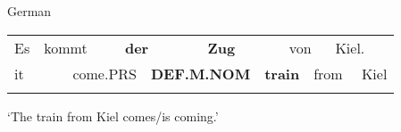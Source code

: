 
\begin{listWWNumileveli}
\item 

\begin{styleExample}
German

\end{styleExample}

\end{listWWNumileveli}

\begin{tabular}{llllllllllll}
\lsptoprule
Es & \multicolumn{2}{l}{kommt

} & \multicolumn{2}{l}{{\bfseries der}

} & \multicolumn{2}{l}{{\bfseries Zug}

} & \multicolumn{2}{l}{von

} & \multicolumn{2}{l}{Kiel.

} & \\
\multicolumn{2}{l}{it

} & \multicolumn{2}{l}{come.PRS

} & \multicolumn{2}{l}{{\bfseries DEF.M.NOM}

} & \multicolumn{2}{l}{{\bfseries train}

} & \multicolumn{2}{l}{from

} & \multicolumn{2}{l}{Kiel

}\\
\lspbottomrule
\end{tabular}

\begin{styleTranslation}
‘The train from Kiel comes/is coming.’

\end{styleTranslation}

